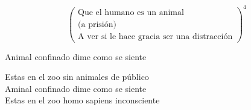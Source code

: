 \documentclass[12pt, a4papre]{article}
\begin{document}
\begin{center}
		\[
		\begin{pmatrix}
		\textrm{Que el humano es un animal}\\
		\textrm{(a prisión)}\\
		\textrm{A ver si le hace gracia ser una distracción}
		\end{pmatrix}^4
		\]
		
		\begin{doublespacing}
		Animal confinado dime como se siente\\
		\end{doublespacing}
		Estas en el zoo sin animales de público\\
		Aminal confinado dime como se siente\\
		Estas en el zoo homo sapiens inconsciente\\
		
		

	\end{center}
\end{document}
